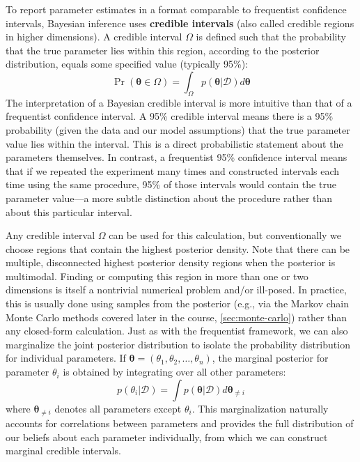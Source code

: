 To report parameter estimates in a format comparable to frequentist confidence intervals, Bayesian inference uses \textbf{credible intervals} (also called credible regions in higher dimensions). A credible interval $\Omega$ is defined such that the probability that the true parameter lies within this region, according to the posterior distribution, equals some specified value (typically 95\%):
\begin{equation}
    \Pr(\boldsymbol{\theta} \in \Omega) = \int_{\Omega} p(\boldsymbol{\theta}|\mathcal{D})d\boldsymbol{\theta}
\end{equation}
The interpretation of a Bayesian credible interval is more intuitive than that of a frequentist confidence interval. A 95\% credible interval means there is a 95\% probability (given the data and our model assumptions) that the true parameter value lies within the interval. This is a direct probabilistic statement about the parameters themselves. In contrast, a frequentist 95\% confidence interval means that if we repeated the experiment many times and constructed intervals each time using the same procedure, 95\% of those intervals would contain the true parameter value---a more subtle distinction about the procedure rather than about this particular interval.

Any credible interval $\Omega$ can be used for this calculation, but conventionally we choose regions that contain the highest posterior density. Note that there can be multiple, disconnected highest posterior density regions when the posterior is multimodal. Finding or computing this region in more than one or two dimensions is itself a nontrivial numerical problem and/or ill-posed. In practice, this is usually done using samples from the posterior (e.g., via the Markov chain Monte Carlo methods covered later in the course, \autoref{sec:monte-carlo}) rather than any closed-form calculation. Just as with the frequentist framework, we can also marginalize the joint posterior distribution to isolate the probability distribution for individual parameters. If $\boldsymbol{\theta} = (\theta_1, \theta_2, \ldots, \theta_n)$, the marginal posterior for parameter $\theta_i$ is obtained by integrating over all other parameters:
\begin{equation}
    p(\theta_i|\mathcal{D}) = \int p(\boldsymbol{\theta}|\mathcal{D})d\boldsymbol{\theta}_{\neq i}
\end{equation}
where $\boldsymbol{\theta}_{\neq i}$ denotes all parameters except $\theta_i$. This marginalization naturally accounts for correlations between parameters and provides the full distribution of our beliefs about each parameter individually, from which we can construct marginal credible intervals.

